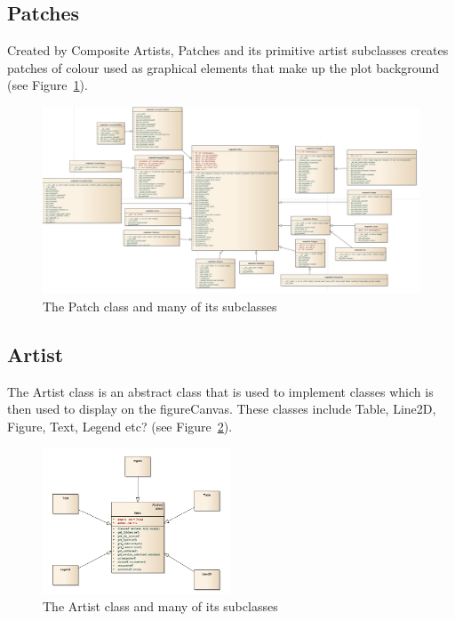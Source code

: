 \documentclass[pdftex,10pt,a4paper]{report}
\begin{document}
\subsection{Patches}
Created by Composite Artists, Patches and its primitive artist subclasses creates patches of colour used as graphical elements that make up the plot background (see Figure~\ref{fig:patch}).
\begin{figure}[ht!]
        \centering
                \includegraphics[width=\textwidth]{img/umls/derek/patch}
        \caption{The Patch class and many of its subclasses}\label{fig:patch}
\end{figure}

\subsection{Artist}

The Artist class is an abstract class that is used to implement classes which is then used to display on the figureCanvas. These classes include Table, Line2D, Figure, Text, Legend etc? (see Figure~\ref{fig:artist}).

\begin{figure}[ht!]
        \centering
                \includegraphics[width=0.5\textwidth]{img/umls/dave/artist}
        \caption{The Artist class and many of its subclasses}\label{fig:artist}
\end{figure}
\end{document}
